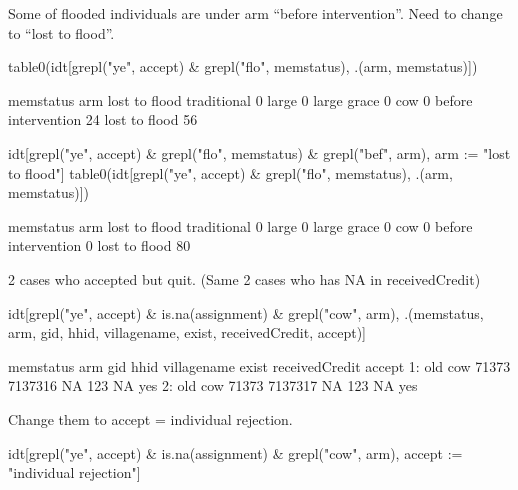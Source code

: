 

	Some of flooded individuals are under \textsf{arm} ``before intervention''. Need to change to ``lost to flood''.
\begin{Schunk}
\begin{Sinput}
table0(idt[grepl("ye", accept) & grepl("flo", memstatus), .(arm, memstatus)])
\end{Sinput}
\begin{Soutput}
                     memstatus
arm                   lost to flood
  traditional                     0
  large                           0
  large grace                     0
  cow                             0
  before intervention            24
  lost to flood                  56
\end{Soutput}
\begin{Sinput}
idt[grepl("ye", accept) & grepl("flo", memstatus) & grepl("bef", arm), 
	arm := "lost to flood"]
table0(idt[grepl("ye", accept) & grepl("flo", memstatus), .(arm, memstatus)])
\end{Sinput}
\begin{Soutput}
                     memstatus
arm                   lost to flood
  traditional                     0
  large                           0
  large grace                     0
  cow                             0
  before intervention             0
  lost to flood                  80
\end{Soutput}
\end{Schunk}
2 cases who accepted but quit. (Same 2 cases who has NA in \textsf{receivedCredit})
\begin{Schunk}
\begin{Sinput}
idt[grepl("ye", accept) & is.na(assignment) & grepl("cow", arm), 
	.(memstatus, arm, gid, hhid, villagename, exist, receivedCredit, accept)]
\end{Sinput}
\begin{Soutput}
   memstatus arm   gid    hhid villagename exist receivedCredit accept
1:       old cow 71373 7137316          NA   123             NA    yes
2:       old cow 71373 7137317          NA   123             NA    yes
\end{Soutput}
\end{Schunk}
Change them to \textsf{accept} = individual rejection.
\begin{Schunk}
\begin{Sinput}
idt[grepl("ye", accept) & is.na(assignment) & grepl("cow", arm), 
	accept := "individual rejection"]
\end{Sinput}
\end{Schunk}

